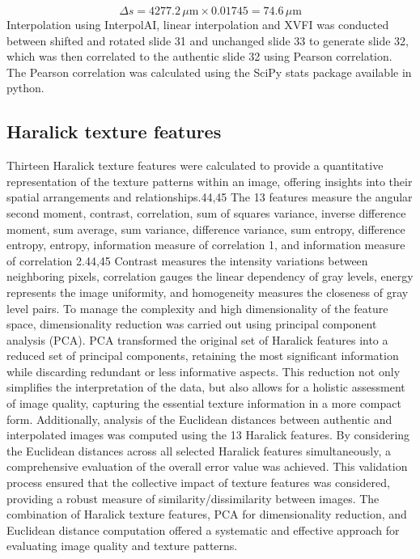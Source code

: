\begin{refsection}
    \begin{equation}
        \Delta s = 4277.2 \, \mu\text{m} \times 0.01745 = 74.6 \, \mu\text{m}
    \end{equation}
    Interpolation using InterpolAI, linear interpolation and XVFI was conducted between shifted and rotated slide 31 and unchanged slide 33 to generate slide 32, which was then correlated to the authentic slide 32 using Pearson correlation. The Pearson correlation was calculated using the SciPy stats package available in python.  
    
    \subsection{Haralick texture features}
    Thirteen Haralick texture features were calculated to provide a quantitative representation of the texture patterns within an image, offering insights into their spatial arrangements and relationships.44,45 The 13 features measure the angular second moment, contrast, correlation, sum of squares variance, inverse difference moment, sum average, sum variance, difference variance, sum entropy, difference entropy, entropy, information measure of correlation 1, and information measure of correlation 2.44,45 Contrast measures the intensity variations between neighboring pixels, correlation gauges the linear dependency of gray levels, energy represents the image uniformity, and homogeneity measures the closeness of gray level pairs.
    To manage the complexity and high dimensionality of the feature space, dimensionality reduction was carried out using principal component analysis (PCA). PCA transformed the original set of Haralick features into a reduced set of principal components, retaining the most significant information while discarding redundant or less informative aspects. This reduction not only simplifies the interpretation of the data, but also allows for a holistic assessment of image quality, capturing the essential texture information in a more compact form.
    Additionally, analysis of the Euclidean distances between authentic and interpolated images was computed using the 13 Haralick features. By considering the Euclidean distances across all selected Haralick features simultaneously, a comprehensive evaluation of the overall error value was achieved. This validation process ensured that the collective impact of texture features was considered, providing a robust measure of similarity/dissimilarity between images. The combination of Haralick texture features, PCA for dimensionality reduction, and Euclidean distance computation offered a systematic and effective approach for evaluating image quality and texture patterns.

\end{refsection}
